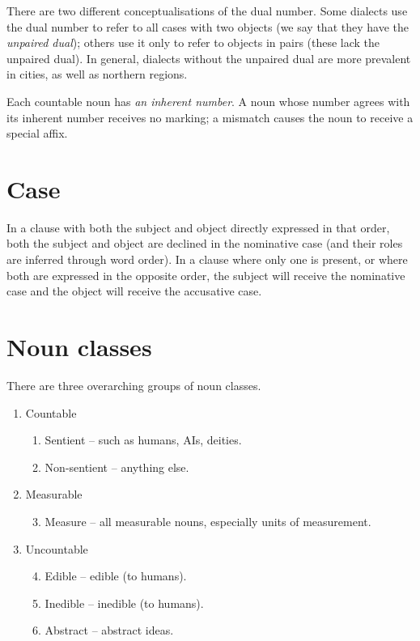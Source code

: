 \documentclass{book}
\begin{document}
There are two different conceptualisations of the dual number. Some dialects use the dual number to refer to all cases with two objects (we say that they have the \emph{unpaired dual}); others use it only to refer to objects in pairs (these lack the unpaired dual). In general, dialects without the unpaired dual are more prevalent in cities, as well as northern regions.

Each countable noun has \emph{an inherent number}. A noun whose number agrees with its inherent number receives no marking; a mismatch causes the noun to receive a special affix.

\section{Case}

In a clause with both the subject and object directly expressed in that order, both the subject and object are declined in the nominative case (and their roles are inferred through word order). In a clause where only one is present, or where both are expressed in the opposite order, the subject will receive the nominative case and the object will receive the accusative case.

\section{Noun classes}

There are three overarching groups of noun classes.

\begin{enumerate}
  \item Countable
  \begin{enumerate}
      \item Sentient -- such as humans, AIs, deities.
      \item Non-sentient -- anything else.
  \end{enumerate}
  \item Measurable
  \begin{enumerate}
      \setcounter{enumi}{2}
      \item Measure -- all measurable nouns, especially units of measurement.
  \end{enumerate}
  \item Uncountable
  \begin{enumerate}
      \setcounter{enumi}{3}
      \item Edible -- edible (to humans).
      \item Inedible -- inedible (to humans).
      \item Abstract -- abstract ideas.
  \end{enumerate}
\end{enumerate}
\end{document}
